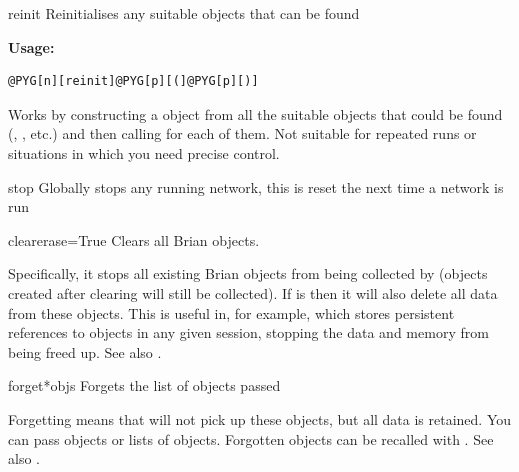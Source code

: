 \documentclass[letterpaper,10pt,english]{manual}
\begin{document}
\hypertarget{brian.reinit}{}\begin{funcdesc}{reinit}{}
Reinitialises any suitable objects that can be found

\textbf{Usage:}

\begin{Verbatim}[commandchars=@\[\]]
@PYG[n][reinit]@PYG[p][(]@PYG[p][)]
\end{Verbatim}

Works by constructing a \hyperlink{brian.MagicNetwork}{} object from all the suitable
objects that could be found (\hyperlink{brian.NeuronGroup}{}, \hyperlink{brian.Connection}{}, etc.) and
then calling  for each of them. Not suitable for repeated
runs or situations in which you need precise control.
\end{funcdesc}

\hypertarget{brian.stop}{}\begin{funcdesc}{stop}{}
Globally stops any running network, this is reset the next time a network is run
\end{funcdesc}

\hypertarget{brian.clear}{}\begin{funcdesc}{clear}{erase=True}
Clears all Brian objects.

Specifically, it stops all existing Brian objects from being collected by
\hyperlink{brian.MagicNetwork}{} (objects created after clearing will still be collected).
If  is  then it will also delete all data from these objects.
This is useful in, for example,  which stores persistent references
to objects in any given session, stopping the data and memory from being freed
up.  See also \hyperlink{brian.forget}{}.
\end{funcdesc}

\hypertarget{brian.forget}{}\begin{funcdesc}{forget}{*objs}
Forgets the list of objects passed

Forgetting means that \hyperlink{brian.MagicNetwork}{} will not pick up these objects,
but all data is retained. You can pass objects or lists of objects. Forgotten
objects can be recalled with \hyperlink{brian.recall}{}. See also \hyperlink{brian.clear}{}.
\end{funcdesc}
\end{document}
